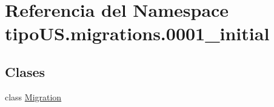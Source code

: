 \hypertarget{namespacetipo_u_s_1_1migrations_1_10001__initial}{}\section{Referencia del Namespace tipo\+U\+S.\+migrations.0001\+\_\+initial}
\label{namespacetipo_u_s_1_1migrations_1_10001__initial}
\subsection*{Clases}
\begin{DoxyCompactItemize}
\item 
class \hyperlink{classtipo_u_s_1_1migrations_1_10001__initial_1_1_migration}{Migration}
\end{DoxyCompactItemize}
